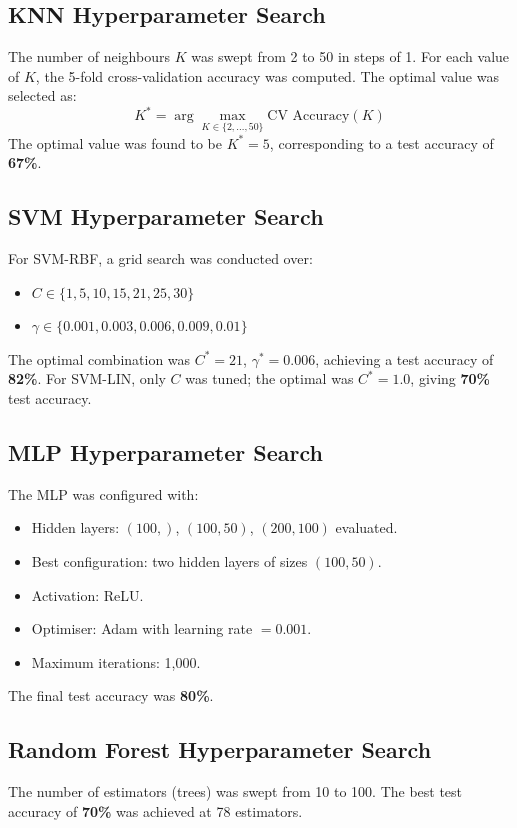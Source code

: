 \subsection{KNN Hyperparameter Search}
The number of neighbours $K$ was swept from 2 to 50 in steps of 1. For each value of $K$, the 5-fold cross-validation accuracy was computed. The optimal value was selected as:
\begin{equation}
    K^* = \arg\max_{K \in \{2, \ldots, 50\}} \text{CV Accuracy}(K)
\end{equation}
The optimal value was found to be $K^* = 5$, corresponding to a test accuracy of \textbf{67\%}.

\subsection{SVM Hyperparameter Search}
For SVM-RBF, a grid search was conducted over:
\begin{itemize}
    \item $C \in \{1, 5, 10, 15, 21, 25, 30\}$
    \item $\gamma \in \{0.001, 0.003, 0.006, 0.009, 0.01\}$
\end{itemize}
The optimal combination was $C^* = 21$, $\gamma^* = 0.006$, achieving a test accuracy of \textbf{82\%}. For SVM-LIN, only $C$ was tuned; the optimal was $C^* = 1.0$, giving \textbf{70\%} test accuracy.

\subsection{MLP Hyperparameter Search}
The MLP was configured with:
\begin{itemize}
    \item Hidden layers: $(100,)$, $(100, 50)$, $(200, 100)$ evaluated.
    \item Best configuration: two hidden layers of sizes $(100, 50)$.
    \item Activation: ReLU.
    \item Optimiser: Adam with learning rate $= 0.001$.
    \item Maximum iterations: 1,000.
\end{itemize}
The final test accuracy was \textbf{80\%}.

\subsection{Random Forest Hyperparameter Search}
The number of estimators (trees) was swept from 10 to 100. The best test accuracy of \textbf{70\%} was achieved at 78 estimators.


